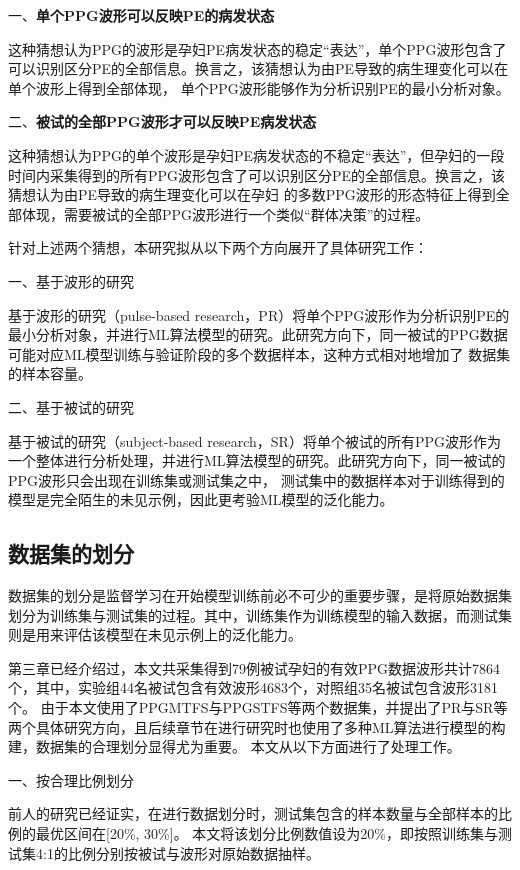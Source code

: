 一、\textbf{单个PPG波形可以反映PE的病发状态}

这种猜想认为PPG的波形是孕妇PE病发状态的稳定“表达”，单个PPG波形包含了可以识别区分PE的全部信息。换言之，该猜想认为由PE导致的病生理变化可以在单个波形上得到全部体现，
单个PPG波形能够作为分析识别PE的最小分析对象。

二、\textbf{被试的全部PPG波形才可以反映PE病发状态}

这种猜想认为PPG的单个波形是孕妇PE病发状态的不稳定“表达”，但孕妇的一段时间内采集得到的所有PPG波形包含了可以识别区分PE的全部信息。换言之，该猜想认为由PE导致的病生理变化可以在孕妇
的多数PPG波形的形态特征上得到全部体现，需要被试的全部PPG波形进行一个类似“群体决策”的过程。

针对上述两个猜想，本研究拟从以下两个方向展开了具体研究工作：

一、基于波形的研究

基于波形的研究（pulse-based research，PR）将单个PPG波形作为分析识别PE的最小分析对象，并进行ML算法模型的研究。此研究方向下，同一被试的PPG数据可能对应ML模型训练与验证阶段的多个数据样本，这种方式相对地增加了
数据集的样本容量。

二、基于被试的研究

基于被试的研究（subject-based research，SR）将单个被试的所有PPG波形作为一个整体进行分析处理，并进行ML算法模型的研究。此研究方向下，同一被试的PPG波形只会出现在训练集或测试集之中，
测试集中的数据样本对于训练得到的模型是完全陌生的未见示例，因此更考验ML模型的泛化能力。

\subsection{数据集的划分}
数据集的划分是监督学习在开始模型训练前必不可少的重要步骤，是将原始数据集划分为训练集与测试集的过程。其中，训练集作为训练模型的输入数据，而测试集则是用来评估该模型在未见示例上的泛化能力。

第三章已经介绍过，本文共采集得到79例被试孕妇的有效PPG数据波形共计7864个，其中，实验组44名被试包含有效波形4683个，对照组35名被试包含波形3181个。
由于本文使用了PPGMTFS与PPGSTFS等两个数据集，并提出了PR与SR等两个具体研究方向，且后续章节在进行研究时也使用了多种ML算法进行模型的构建，数据集的合理划分显得尤为重要。
本文从以下方面进行了处理工作。

一、按合理比例划分

前人的研究已经证实，在进行数据划分时，测试集包含的样本数量与全部样本的比例的最优区间在[20\%, 30\%]\cite{Gholamy2018Why7O}。
本文将该划分比例数值设为20\%，即按照训练集与测试集4:1的比例分别按被试与波形对原始数据抽样。

